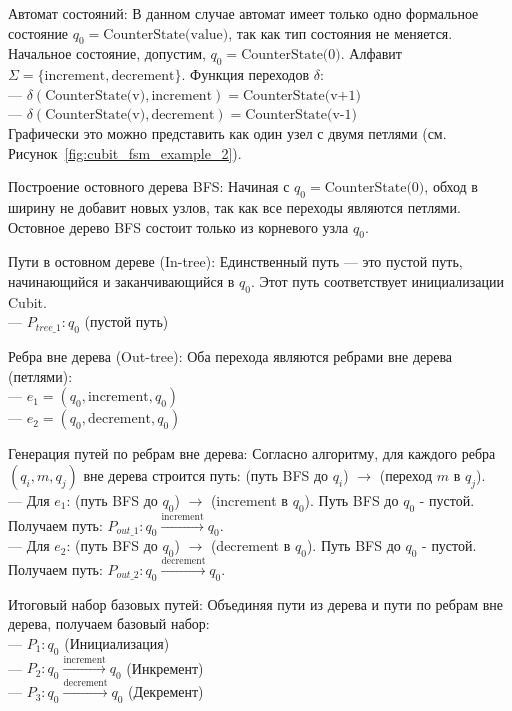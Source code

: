 \documentclass[14pt, russian]{scrartcl}
\begin{document}
\begin{enumerate*}
    \item {Автомат состояний:} В данном случае автомат имеет только одно формальное состояние $q_0 = \text{CounterState(value)}$, так как тип состояния не меняется. Начальное состояние, допустим, $q_0 = \text{CounterState(0)}$. Алфавит $\Sigma = \{ \text{increment}, \text{decrement} \}$. Функция переходов $\delta$:
            \\ --- $\delta(\text{CounterState(v)}, \text{increment}) = \text{CounterState(v+1)}$
            \\ --- $\delta(\text{CounterState(v)}, \text{decrement}) = \text{CounterState(v-1)}$\\
        Графически это можно представить как один узел с двумя петлями (см. Рисунок~\ref{fig:cubit_fsm_example_2}).

    \item {Построение остовного дерева BFS:} Начиная с $q_0 = \text{CounterState(0)}$, обход в ширину не добавит новых узлов, так как все переходы являются петлями. Остовное дерево BFS состоит только из корневого узла $q_0$.

    \item {Пути в остовном дереве (In-tree):} Единственный путь — это пустой путь, начинающийся и заканчивающийся в $q_0$. Этот путь соответствует инициализации Cubit.
            \\ --- $P_{tree\_1}: q_0$ (пустой путь)\\

    \item {Ребра вне дерева (Out-tree):} Оба перехода являются ребрами вне дерева (петлями):
            \\ --- $e_1 = (q_0, \text{increment}, q_0)$
            \\ --- $e_2 = (q_0, \text{decrement}, q_0)$\\

    \item {Генерация путей по ребрам вне дерева:} Согласно алгоритму, для каждого ребра $(q_i, m, q_j)$ вне дерева строится путь: (путь BFS до $q_i$) $\rightarrow$ (переход $m$ в $q_j$).
            \\ --- Для $e_1$: (путь BFS до $q_0$) $\rightarrow$ (increment в $q_0$). Путь BFS до $q_0$ - пустой. Получаем путь: $P_{out\_1}: q_0 \xrightarrow{\text{increment}} q_0$.
            \\ --- Для $e_2$: (путь BFS до $q_0$) $\rightarrow$ (decrement в $q_0$). Путь BFS до $q_0$ - пустой. Получаем путь: $P_{out\_2}: q_0 \xrightarrow{\text{decrement}} q_0$.\\

    \item {Итоговый набор базовых путей:} Объединяя пути из дерева и пути по ребрам вне дерева, получаем базовый набор:
            \\ --- $P_1: q_0$ (Инициализация)
            \\ --- $P_2: q_0 \xrightarrow{\text{increment}} q_0$ (Инкремент)
            \\ --- $P_3: q_0 \xrightarrow{\text{decrement}} q_0$ (Декремент)\\
\end{enumerate*}
\end{document}
